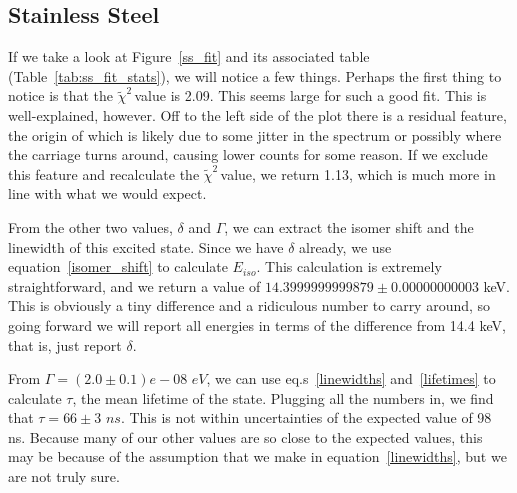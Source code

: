 \documentclass[reprint, nobibnotes, amssymb, amsmath, amsfonts, mathtools, mathrsfs, floatfix]{revtex4-1}
\newcommand{\redchi}{$\tilde{\chi}^2\,$}
\begin{document}
    \subsection{Stainless Steel}
      If we take a look at Figure~\ref{ss_fit} and its associated table (Table~\ref{tab:ss_fit_stats}), we will notice a few things.  Perhaps the first thing to notice is that the \redchi value is 2.09.  This seems large for such a good fit.  This is well-explained, however.  Off to the left side of the plot there is a residual feature, the origin of which is likely due to some jitter in the spectrum or possibly where the carriage turns around, causing lower counts for some reason.  If we exclude this feature and recalculate the \redchi value, we return 1.13, which is much more in line with what we would expect.

      From the other two values, $\delta$ and $\Gamma$, we can extract the isomer shift and the linewidth of this excited state.  Since we have $\delta$ already, we use equation~\ref{isomer_shift} to calculate $E_{iso}$.  This calculation is extremely straightforward, and we return a value of $14.3999999999879 \pm 0.00000000003$ keV.  This is obviously a tiny difference and a ridiculous number to carry around, so going forward we will report all energies in terms of the difference from 14.4 keV, that is, just report $\delta$.

      From $\Gamma = (2.0 \pm 0.1)e-08 \,\, eV$, we can use eq.s~\ref{linewidths} and~\ref{lifetimes} to calculate $\tau$, the mean lifetime of the state.  Plugging all the numbers in, we find that $\tau = 66\pm3\,\, ns$.  This is not within uncertainties of the expected value of 98 ns.  Because many of our other values are so close to the expected values, this may be because of the assumption that we make in equation~\ref{linewidths}, but we are not truly sure.
\end{document}
